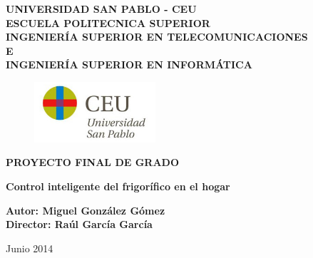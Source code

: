 \pagestyle{plain} %

\begin{titlepage}
\begin{center}
        \Large
        \vspace{1cm}
        \bfseries\textbf{UNIVERSIDAD SAN PABLO - CEU\\}
        \vspace{1cm}
        \large
        \mdseries\textsf{ESCUELA POLITECNICA SUPERIOR\\}
        \vspace{0.5cm}
        \textsf{INGENIERÍA SUPERIOR EN TELECOMUNICACIONES\\
            E\\
            INGENIERÍA SUPERIOR EN INFORMÁTICA}
        \vspace{0.5cm}

        \begin{figure}[htbp]
            \centering
                \includegraphics[width=0.40\textwidth]{CEU_Universidad_San_Pablo.jpg}
            \label{fig:logoceu}
        \end{figure}

        \large
        \vspace*{2cm}
        \bfseries\textbf{PROYECTO FINAL DE GRADO\\}

        \Large
        \vspace*{1.5cm}
        \bfseries\textbf{Control inteligente del frigorífico en el hogar}
        \vspace{1cm}

        \large
        \bfseries\textbf{Autor: Miguel González Gómez\\
        Director: Raúl García García}
        \vspace{1.5cm}


        \mdseries\textsf{Junio 2014}
    \end{center}
\end{titlepage}

